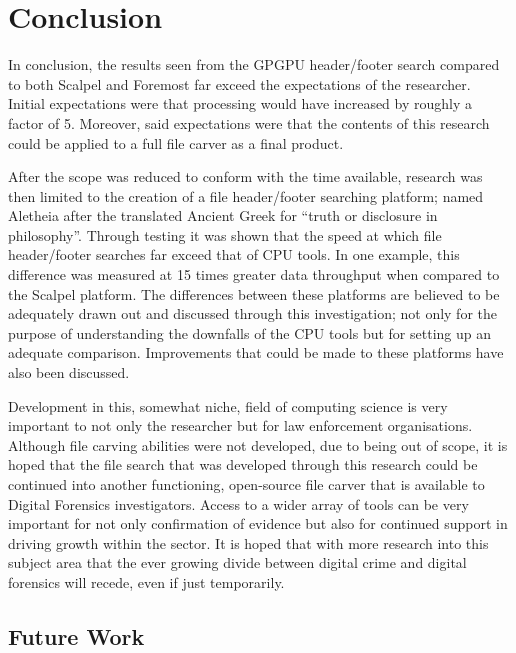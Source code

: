 
\chapter{Conclusion}
In conclusion, the results seen from the \acl{GPGPU} header/footer search compared to both Scalpel and Foremost far exceed the expectations of the researcher.
Initial expectations were that processing would have increased by roughly a factor of 5.
Moreover, said expectations were that the contents of this research could be applied to a full file carver as a final product.

After the scope was reduced to conform with the time available, research was then limited to the creation of a file header/footer searching platform; named Aletheia after the translated Ancient Greek for ``truth or disclosure in philosophy''.
Through testing it was shown that the speed at which file header/footer searches far exceed that of CPU tools.
In one example, this difference was measured at 15 times greater data throughput when compared to the Scalpel platform.
The differences between these platforms are believed to be adequately drawn out and discussed through this investigation;
not only for the purpose of understanding the downfalls of the CPU tools but for setting up an adequate comparison.
Improvements that could be made to these platforms have also been discussed.

Development in this, somewhat niche, field of computing science is very important to not only the researcher but for law enforcement organisations.
Although file carving abilities were not developed, due to being out of scope, it is hoped that the file search that was developed through this research could be continued into another functioning, open-source file carver that is available to Digital Forensics investigators.
Access to a wider array of tools can be very important for not only confirmation of evidence but also for continued support in driving growth within the sector.
It is hoped that with more research into this subject area that the ever growing divide between digital crime and digital forensics will recede, even if just temporarily.
\newpage
\section{Future Work}
